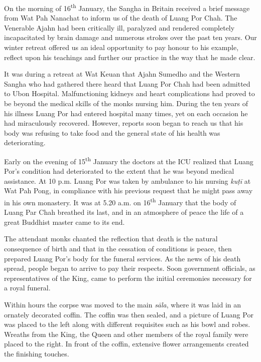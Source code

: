 
On the morning of 16\textsuperscript{th} January, the Sangha in Britain received a brief
message from Wat Pah Nanachat to inform us of the death of Luang Por
Chah. The Venerable Ajahn had been critically ill, paralyzed and
rendered completely incapacitated by brain damage and numerous strokes
over the past ten years. Our winter retreat offered us an ideal
opportunity to pay honour to his example, reflect upon his teachings and
further our practice in the way that he made clear. 

It was during a retreat at Wat Keuan that Ajahn Sumedho and the
Western Sangha who had gathered there heard that Luang Por Chah had been
admitted to Ubon Hospital. Malfunctioning kidneys and heart
complications had proved to be beyond the medical skills of the monks
nursing him. During the ten years of his illness Luang Por had entered
hospital many times, yet on each occasion he had miraculously recovered. 
However, reports soon began to reach us that his body was refusing to
take food and the general state of his health was deteriorating. 

Early on the evening of 15\textsuperscript{th} January the doctors at the ICU realized
that Luang Por's condition had deteriorated to the extent that he was
beyond medical assistance. At 10 p.m. Luang Por was taken by ambulance to
his nursing \emph{kuṭī} at Wat Pah Pong, in compliance with his previous
request that he might pass away in his own monastery. It was at 5.20 a.m.
on 16\textsuperscript{th} January that the body of Luang Par Chah breathed its last, and
in an atmosphere of peace the life of a great Buddhist master came to
its end. 

The attendant monks chanted the reflection that death is the natural
consequence of birth and that in the cessation of conditions is peace, 
then prepared Luang Por's body for the funeral services. As the news of
his death spread, people began to arrive to pay their respects. Soon
government officials, as representatives of the King, came to perform
the initial ceremonies necessary for a royal funeral. 

Within hours the corpse was moved to the main \emph{sāla}, where it was
laid in an ornately decorated coffin. The coffin was then sealed, and a
picture of Luang Por was placed to the left along with different
requisites such as his bowl and robes. Wreaths from the King, the Queen
and other members of the royal family were placed to the right. In front
of the coffin, extensive flower arrangements created the finishing
touches. 

